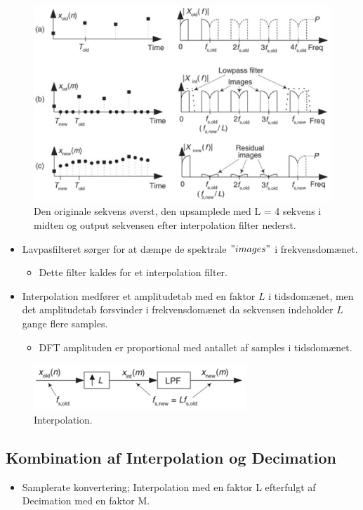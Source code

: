 \documentclass[danish]{article}
\begin{document}
\begin{figure}[H]
	\centering
	\includegraphics[width=0.6\linewidth]{graphics/interpolation1}
	\caption{Den originale sekvens øverst, den upsamplede med L = 4 sekvens i midten og output sekvensen efter interpolation filter nederst.}
	\label{fig:interpolation1}
\end{figure}

\begin{itemize}
	\item Lavpasfilteret sørger for at dæmpe de spektrale $"images"$ i frekvensdomænet.
	\begin{itemize}
		\item Dette filter kaldes for et interpolation filter.
	\end{itemize}
	\item Interpolation medfører et amplitudetab med en faktor $L$ i tidsdomænet, men det amplitudetab forsvinder i frekvensdomænet da sekvensen indeholder $L$ gange flere samples.
	\begin{itemize}
		\item DFT amplituden er proportional med antallet af samples i tidsdomænet.
	\end{itemize}
\end{itemize}


\begin{figure}[H]
	\centering
	\includegraphics[width=0.5\linewidth]{graphics/Interpolation2}
	\caption{Interpolation.}
	\label{fig:Interpolation2}
\end{figure}

\subsection{Kombination af Interpolation og Decimation}
\begin{itemize}
	\item Samplerate konvertering; Interpolation med en faktor L efterfulgt af Decimation med en faktor M.
\end{itemize}
\end{document}
